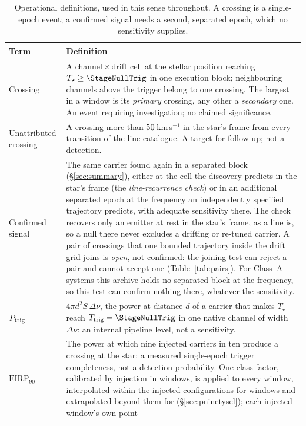 \begin{table}
\centering
\caption{Operational definitions, used in this sense throughout. A crossing is
a single-epoch event; a confirmed signal needs a second, separated epoch,
which no sensitivity supplies.}
\label{tab:quantities}
\small
\begin{tabular}{@{}p{}p{}@{}}
\hline
Term & Definition \\
\hline
Crossing &
A channel\,$\times$\,drift cell at the stellar position reaching
$T_\star\geq\StageNullTrig$ in one execution block; neighbouring channels
above the trigger belong to one crossing. The largest in a window is its
\emph{primary} crossing, any other a \emph{secondary} one. An event requiring
investigation; no claimed significance. \\
Unattributed crossing &
A crossing more than $50$\,km\,s$^{-1}$ in the star's frame from
every transition of the line catalogue. A target for follow-up; not a
detection. \\
Confirmed signal &
The same carrier found again in a separated block (\S\ref{sec:summary}),
either at the cell the discovery predicts in the star's frame (the
\emph{line-recurrence check}) or in an additional separated epoch at the
frequency an independently specified trajectory predicts, with adequate
sensitivity there. The check recovers only an emitter at rest in the star's
frame, as a line is, so a null there never excludes a drifting or re-tuned
carrier. A pair of crossings that one bounded trajectory inside the drift
grid joins is \emph{open}, not confirmed: the joining test can reject a pair
and cannot accept one (Table~\ref{tab:pairs}). For \ZcNoRepSys{} Class~A
systems this archive holds no separated block at the frequency, so this test
can confirm nothing there, whatever the sensitivity. \\
$P_{\rm trig}$ &
$4\pi d^{2}S\,\Delta\nu$, the power at distance $d$ of a carrier that makes
$T_\star$ reach $T_{\rm trig}=\StageNullTrig$ in one native channel of width
$\Delta\nu$: an internal pipeline level, not a sensitivity. \\
$\mathrm{EIRP}_{90}$ &
The power at which nine injected carriers in ten produce a crossing at the
star: a measured single-epoch trigger completeness, not a detection
probability. One class factor, calibrated by injection in \SensNInj{}
windows, is applied to every window, interpolated within the injected
configurations for \NgNInterpWin{} windows and extrapolated beyond them for
\NgNExtrapWin{} (\S\ref{sec:pninetysel}); each injected window's own point

\end{tabular}
\end{table}
